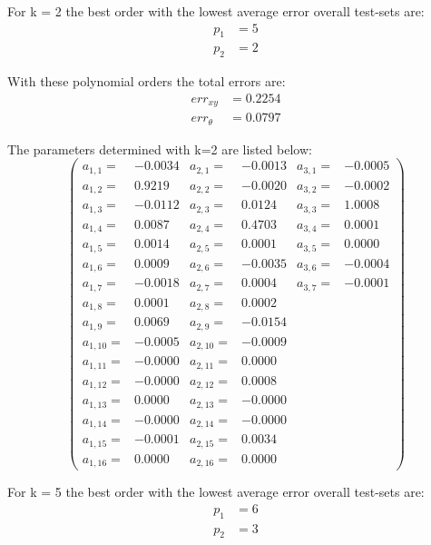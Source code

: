 \documentclass[conference]{IEEEtran}
\begin{document}
\begin{compactenum}[a)]

\item For k = 2 the best order with the lowest average error overall test-sets are:
\begin{align}
	p_1 & = 5\\
	p_2 & = 2
\end{align}

With these polynomial orders the total errors are:
\begin{align}
	err_{xy} & = 0.2254\\
	err_{\theta} & = 0.0797
\end{align}

The parameters determined with k=2 are listed below:
$$
\left(
\scriptscriptstyle{
\begin{smallmatrix}
a_{1,1} =& -0.0034 	& a_{2,1} =& -0.0013 & a_{3,1} =& -0.0005\\
a_{1,2} =&  0.9219  & a_{2,2} =& -0.0020 & a_{3,2} =& -0.0002\\
a_{1,3} =& -0.0112 	& a_{2,3} =&  0.0124 & a_{3,3} =&  1.0008\\
a_{1,4} =&  0.0087  & a_{2,4} =&  0.4703 & a_{3,4} =&  0.0001\\
a_{1,5} =&  0.0014  & a_{2,5} =&  0.0001 & a_{3,5} =&  0.0000\\
a_{1,6} =&  0.0009  & a_{2,6} =& -0.0035 & a_{3,6} =& -0.0004\\
a_{1,7} =& -0.0018 	& a_{2,7} =&  0.0004 & a_{3,7} =& -0.0001\\
a_{1,8} =&  0.0001  & a_{2,8} =&  0.0002	\\
a_{1,9} =&  0.0069  & a_{2,9} =& -0.0154	\\
a_{1,10} =&-0.0005 	& a_{2,10} =&-0.0009	\\
a_{1,11} =&-0.0000 	& a_{2,11} =& 0.0000	\\
a_{1,12} =&-0.0000 	& a_{2,12} =& 0.0008	\\
a_{1,13} =& 0.0000  & a_{2,13} =&-0.0000	\\
a_{1,14} =&-0.0000 	& a_{2,14} =&-0.0000	\\
a_{1,15} =&-0.0001 	& a_{2,15} =& 0.0034	\\
a_{1,16} =& 0.0000  & a_{2,16} =& 0.0000	
\end{smallmatrix}}
\right)
$$

\item For k = 5 the best order with the lowest average error overall test-sets are:
\begin{align}
	p_1 & = 6\\
	p_2 & = 3
\end{align}


\end{compactenum}
\end{document}
